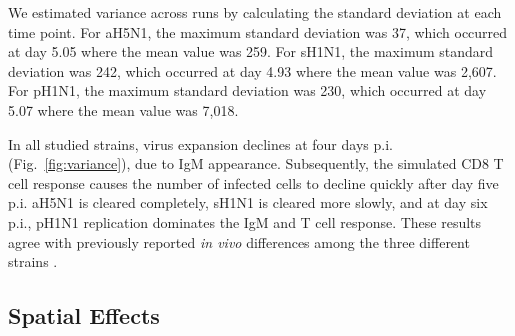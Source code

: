 \documentclass[10pt]{article}
\begin{document}

We estimated variance across runs by calculating the standard deviation at each time point.  For aH5N1, the maximum standard deviation was 37, which occurred at day 5.05 where the mean value was 259.  For sH1N1, the maximum standard deviation was 242, which occurred at day 4.93 where the mean value was 2,607.  For pH1N1, the maximum standard deviation was 230, which occurred at day 5.07 where the mean value was 7,018.

In all studied strains, virus expansion declines at four days p.i. (Fig.~\ref{fig:variance}), due to IgM appearance.  Subsequently, the simulated CD8 T cell response causes the number of infected cells to decline quickly after day five p.i.  aH5N1 is cleared completely, sH1N1 is cleared more slowly, and at day six p.i., pH1N1 replication dominates the IgM and T cell response.  These results agree with previously reported \textit{in vivo} differences among the three different strains \cite{Mitchell2011}.



\subsection*{Spatial Effects}

\end{document}

